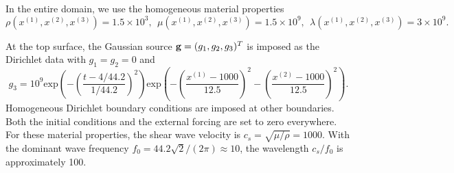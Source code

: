 In the entire domain, we use the homogeneous material properties
\begin{equation*}
\rho(x^{(1)},x^{(2)},x^{(3)}) = 1.5\times 10^3,\ \  \mu(x^{(1)},x^{(2)},x^{(3)}) = 1.5\times 10^9,\ \ 
\lambda(x^{(1)},x^{(2)},x^{(3)})  = 3\times 10^9.
\end{equation*}

At the top surface, the Gaussian source 
${\bf g} = (g_1,g_2,g_3)^T$ is imposed as the Dirichlet data with $g_1 = g_2 = 0$ and 
\[g_3 = 10^9 \text{exp}\left(-\left(\frac{t-4/44.2}{1/44.2}\right)^2\right)\text{exp}\left(-\left(\frac{x^{(1)}-1000}{12.5}\right)^2-\left(\frac{x^{(2)}-1000}{12.5}\right)^2\right).\]  
Homogeneous Dirichlet boundary conditions are imposed at other boundaries. Both the initial conditions and the external forcing are set to zero everywhere. %
For these material properties, the shear wave velocity is $c_s = \sqrt{\mu/\rho}=1000$. With the dominant wave frequency $f_0=44.2\sqrt{2}/(2\pi)\approx 10$, the wavelength $c_s/f_0$ is approximately 100.

